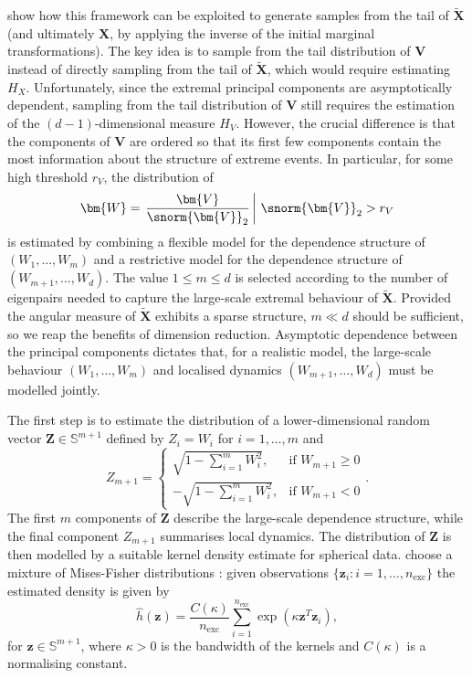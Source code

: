 \documentclass[en-GB, a4paper, nobind]{templates/bathreport}
\begin{document}
\textcite{rohrbeckSimulatingFloodEvent2021} show how this framework can be exploited to generate samples from the tail of \(\tilde{\bm{X}}\) (and ultimately \(\bm{X}\), by applying the inverse of the initial marginal transformations). The key idea is to sample from the tail distribution of \(\bm{V}\) instead of directly sampling from the tail of \(\tilde{\bm{X}}\), which would require estimating \(H_X\). Unfortunately, since the extremal principal components are asymptotically dependent, sampling from the tail distribution of \(\bm{V}\) still requires the estimation of the \((d-1)\)-dimensional measure \(H_V\). However, the crucial difference is that the components of \(\bm{V}\) are ordered so that its first few components contain the most information about the structure of extreme events. In particular, for some high threshold \(r_V\), the distribution of
\begin{equation*}
\bm{W} = \left. \frac{\bm{V}}{\snorm{\bm{V}}_2} \, \right| \, \snorm{\bm{V}}_2>r_V
\end{equation*}
is estimated by combining a flexible model for the dependence structure of \((W_1,\ldots,W_m)\) and a restrictive model for the dependence structure of \((W_{m+1},\ldots,W_d)\). The value \(1\leq m\leq d\) is selected according to the number of eigenpairs needed to capture the large-scale extremal behaviour of \(\tilde{\bm{X}}\). Provided the angular measure of \(\tilde{\bm{X}}\) exhibits a sparse structure, \(m\ll d\) should be sufficient, so we reap the benefits of dimension reduction. Asymptotic dependence between the principal components dictates that, for a realistic model, the large-scale behaviour \((W_1,\ldots,W_m)\) and localised dynamics \((W_{m+1},\ldots,W_d)\) must be modelled jointly.

The first step is to estimate the distribution of a lower-dimensional random vector \(\bm{Z}\in\mathbb{S}^{m+1}\) defined by \(Z_i=W_i\) for \(i=1,\ldots,m\) and
\begin{equation*}
Z_{m+1} = 
\begin{cases}
\sqrt{1-\sum_{i=1}^m W_i^2}, & \text{if } W_{m+1}\geq 0 \\
-\sqrt{1-\sum_{i=1}^m W_i^2}, & \text{if } W_{m+1}< 0
\end{cases}.
\end{equation*}
The first \(m\) components of \(\bm{Z}\) describe the large-scale dependence structure, while the final component \(Z_{m+1}\) summarises local dynamics. The distribution of \(\bm{Z}\) is then modelled by a suitable kernel density estimate for spherical data. \textcite{rohrbeckSimulatingFloodEvent2021} choose a mixture of Mises-Fisher distributions \autocite{hallKernelDensityEstimation1986}: given observations \(\{\bm{z}_i:i=1,\ldots,n_{\text{exc}}\}\) the estimated density is given by
\begin{equation*}
\hat{h}(\bm{z})=\frac{C(\kappa)}{n_{\text{exc}}} \sum_{i=1}^{n_{\text{exc}}}\exp(\kappa\bm{z}^T\bm{z}_i),
\end{equation*}
for \(\bm{z}\in\mathbb{S}^{m+1}\), where \(\kappa>0\) is the bandwidth of the kernels and \(C(\kappa)\) is a normalising constant.
\end{document}
